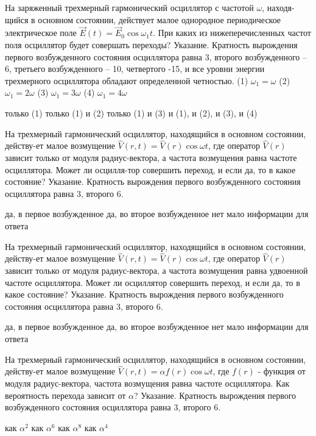 \documentclass[11pt,a4paper]{exam}
\begin{document}
\begin{questions}
\question На заряженный трехмерный гармонический осциллятор с частотой $\omega $, находя-щийся в основном состоянии, действует малое однородное периодическое электрическое поле $\vec E(t) = {\vec E_0}\cos {\omega _1}t$. При каких из нижеперечисленных частот поля осциллятор будет совершать переходы? Указание. Кратность вырождения первого возбужденного состояния осциллятора равна 3, второго возбужденного – 6, третьего возбужденного – 10, четвертого -15, и все уровни энергии трехмерного осциллятора обладают определенной четностью.
(1) ${\omega _1} = \omega $   (2) ${\omega _1} = 2\omega $  (3) ${\omega _1} = 3\omega $  (4) ${\omega _1} = 4\omega $
\begin{choices}
\choice только (1)        
\choice только (1) и (2)
\choice только (1) и (3)     
\choice и (1), и (2), и (3), и (4)
\end{choices}

\question На трехмерный гармонический осциллятор, находящийся в основном состоянии, действу-ет малое возмущение $\hat V(r,t) = \hat V(r)\cos \omega t$, где оператор $\hat V(r)$ зависит только от модуля радиус-вектора, а частота возмущения равна частоте осциллятора. Может ли осцилля-тор совершить переход, и если да, то в какое состояние? Указание. Кратность вырождения первого возбужденного состояния осциллятора равна 3, второго 6.
\begin{choices}
\choice да, в первое возбужденное  
\choice да, во второе возбужденное
\choice нет               
\choice мало информации для ответа
\end{choices}

\question На трехмерный гармонический осциллятор, находящийся в основном состоянии, действу-ет малое возмущение $\hat V(r,t) = \hat V(r)\cos \omega t$, где оператор $\hat V(r)$ зависит только от модуля радиус-вектора, а частота возмущения равна удвоенной частоте осциллятора. Может ли осциллятор совершить переход, и если да, то в какое состояние? Указание. Кратность вырождения первого возбужденного состояния осциллятора равна 3, второго 6.
\begin{choices}
\choice да, в первое возбужденное  
\choice да, во второе возбужденное
\choice нет               
\choice мало информации для ответа
\end{choices}

\question На трехмерный гармонический осциллятор, находящийся в основном состоянии, действу-ет малое возмущение $\hat V(r,t) = \alpha f(r)\cos \omega t$, где $f(r)$ - функция от модуля радиус-вектора, частота возмущения равна частоте осциллятора. Как вероятность перехода зависит от $\alpha $? Указание. Кратность вырождения первого возбужденного состояния осциллятора равна 3, второго 6.
\begin{choices}
\choice как ${\alpha ^2}$ 
\choice как ${\alpha ^6}$ 
\choice как ${\alpha ^8}$ 
\choice как ${\alpha ^4}$
\end{choices}


\end{questions}
\end{document}

